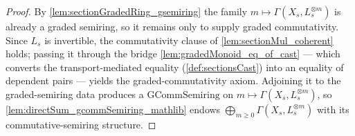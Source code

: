 \begin{proof}
  By \cref{lem:sectionGradedRing_gsemiring} the family
  \(m \mapsto \Gamma(X_s, L_s^{\otimes m})\) is already a graded semiring, so it
  remains only to supply graded commutativity. Since \(L_s\) is invertible, the
  commutativity clause of \cref{lem:sectionMul_coherent} holds; passing it through
  the bridge \cref{lem:gradedMonoid_eq_of_cast} --- which converts the
  transport-mediated equality (\cref{def:sectionsCast}) into an equality of
  dependent pairs --- yields the graded-commutativity axiom. Adjoining it to the
  graded-semiring data produces a \(\mathrm{GCommSemiring}\) on
  \(m \mapsto \Gamma(X_s, L_s^{\otimes m})\), so
  \cref{lem:directSum_gcommSemiring_mathlib} endows
  \(\bigoplus_{m \ge 0} \Gamma(X_s, L_s^{\otimes m})\) with its commutative-semiring
  structure.
\end{proof}

